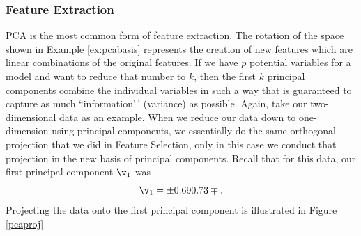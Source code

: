 \documentclass[
]{article}
\theoremstyle{definition}
\theoremstyle{definition}
\theoremstyle{definition}
\theoremstyle{definition}
\theoremstyle{remark}
\begin{document}
\hypertarget{feature-extraction}{%
\subsubsection{Feature Extraction}\label{feature-extraction}}

PCA is the most common form of feature extraction. The rotation of the space shown in Example \ref{ex:pcabasis} represents the creation of new features which are linear combinations of the original features. If we have \(p\) potential variables for a model and want to reduce that number to \(k\), then the first \(k\) principal components combine the individual variables in such a way that is guaranteed to capture as much ``information'\,' (variance) as possible. Again, take our two-dimensional data as an example. When we reduce our data down to one-dimension using principal components, we essentially do the same orthogonal projection that we did in Feature Selection, only in this case we conduct that projection in the new basis of principal components. Recall that for this data, our first principal component \(\v_1\) was \[\v_1 = \pm 0.69 \\0.73 \mp.\]
Projecting the data onto the first principal component is illustrated in Figure \ref{pcaproj}
\end{document}
